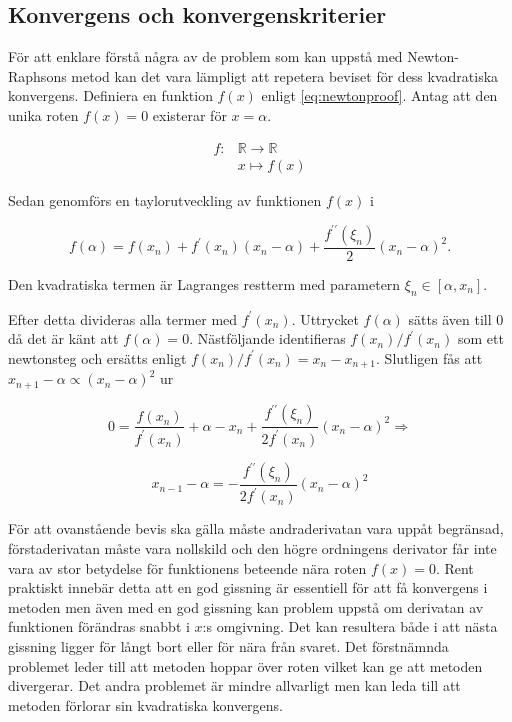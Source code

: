 \subsection{Konvergens och konvergenskriterier}

För att enklare förstå några av de problem som kan uppstå med Newton-Raphsons metod kan det vara lämpligt
att repetera beviset för dess kvadratiska konvergens. Definiera en funktion $f(x)$ enligt \eqref{eq:newtonproof}.
Antag att den unika roten $f(x) = 0$ existerar för $x = \alpha$.

\begin{align}
f: & \mathbb{R} \to \mathbb{R} \nonumber \\
   & x \mapsto f(x) \label{eq:newtonproof}
\end{align}

\noindent
Sedan genomförs en taylorutveckling av funktionen $f(x)$ i 

\begin{equation}
\label{eq:newtonprooftaylor}
f(\alpha) = f(x_n) + f^\prime(x_n)(x_n-\alpha) + \frac{f^{\prime\prime}(\xi_n)}{2}(x_n-\alpha)^2.
\end{equation}

Den kvadratiska termen är Lagranges restterm med parametern $\xi_n \in [\alpha, x_n]$.

Efter detta divideras alla termer med $f^\prime(x_n)$. Uttrycket $f(\alpha)$ sätts även till $0$ då det är känt att $f(\alpha)=0$.
Nästföljande identifieras  $f(x_n)/f^\prime(x_n)$ som ett newtonsteg och ersätts enligt
$f(x_n)/f^\prime(x_n) = x_n-x_{n+1}$. Slutligen fås att $x_{n+1}-\alpha \propto (x_{n}-\alpha)^2$ ur

\begin{equation}
0 = \frac{f(x_n)}{f^\prime(x_n)} + \alpha - x_n + \frac{f^{\prime\prime}(\xi_n)}{2f^\prime(x_n)}(x_n-\alpha)^2
\Rightarrow
\end{equation}

\begin{equation}
\label{eq:newtonqed}
x_{n-1} - \alpha = - \frac{f^{\prime\prime}(\xi_n)}{2f^\prime(x_n)}(x_n-\alpha)^2 
\end{equation}

För att ovanstående bevis ska gälla måste andraderivatan vara uppåt begränsad, förstaderivatan måste vara nollskild och den högre ordningens derivator får inte vara av stor betydelse för funktionens beteende nära roten $f(x) = 0$. Rent praktiskt innebär detta att en god gissning är essentiell för att få
konvergens i metoden men även med en god gissning kan problem uppstå om derivatan av funktionen
förändras snabbt i $x$:s omgivning. Det kan resultera både i att nästa gissning ligger för långt
bort eller för nära från svaret. Det förstnämnda problemet leder till att metoden hoppar över roten vilket kan ge att metoden divergerar. Det andra problemet är mindre allvarligt men kan leda till att metoden förlorar sin kvadratiska konvergens.

